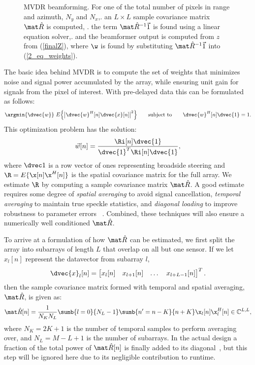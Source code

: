 {\begin{figure}[t]\centering%
%
\caption{MVDR beamforming. For one of the total number of pixels in range and azimuth, $N_y$ and $N_x$,. an $L\times{}L$ sample covariance matrix $\eR$ is computed, . the term $\eR^{-1}\1$ is found using a linear equation solver,. and the beamformer output is computed from $z$ from (\ref{finalZ}), where $\w$ is found by substituting $\eR^{-1}\1$ into (\ref{2_eq_weights}). }\label{mvdr_beamforming}
\end{figure}
%
The basic idea behind MVDR is to compute the set of weights that minimizes noise and signal power accumulated by the array, while ensuring unit gain for signals from the pixel of interest. With pre-delayed data this can be formulated as follows:
%
\begin{gather}
\argmin{\dvec{w}}\ E\Big\{\big|\dvec{w}^H[n]\dvec{x}[n]\big|^2\Big\} \qquad\text{subject to}\qquad \dvec{w}^H[n]\dvec{1} = 1. \label{2_eq_mvdr_def}
\end{gather}
%
This optimization problem has the solution:
%
\begin{gather}
\vec w[n] = \frac{\Ri[n]\dvec{1}}{\dvec{1}^T\Ri[n]\dvec{1}},\label{2_eq_weights}
\end{gather}
%
where $\dvec1$ is a row vector of ones representing broadside steering and $\R=E\{\x[n]\x^H[n]\}$ is the spatial covariance matrix for the full array. We estimate $\R$ by computing a sample covariance matrix $\eR$. A good estimate requires some degree of \emph{spatial averaging} to avoid signal cancellation, \emph{temporal averaging} to maintain true speckle statistics, and \emph{diagonal loading} to improve robustness to parameter errors ~\cite{Synnevag2009a}. Combined, these techniques will also ensure a numerically well conditioned $\eR$. 

To arrive at a formulation of how $\eR$ can be estimated, we first split the array into subarrays of length $L$ that overlap on all but one sensor. If we let $x_l[n]$ represent the datavector from subarray $l$,
%
\begin{gather}
\dvec{x}_l[n] = \bmat{x_l[n] & x_{l+1}[n] & \dots & x_{l+L-1}[n]}^T.
\end{gather}
%
then the sample covariance matrix formed with temporal and spatial averaging, $\eR$, is given as:
%
\begin{gather}
\eR[n] =  \frac{1}{N_K N_L} \sumb{l=0}{N_L-1}\sumb{n'=n-K}{n+K} \x_l[n]\x_l^H[n] \in\mathbb{C}^{L,L},\label{2_eq_spatialR}
\end{gather}
%
where $N_K = 2K+1$ is the number of temporal samples to perform averaging over, and $N_L = M-L+1$ is the number of subarrays. In the actual design a fraction of the total power of $\eR[n]$ is finally added to its diagonal~\cite{Synnevag2007}, but this step will be ignored here due to its negligible contribution to runtime.

}
